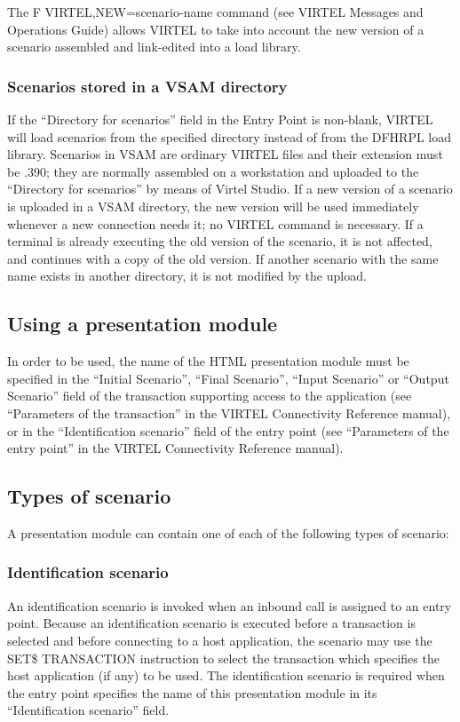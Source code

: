 \documentclass[letterpaper,10pt,english]{sphinxmanual}
\begin{document}
The F VIRTEL,NEW=scenario-name command (see VIRTEL Messages and Operations Guide) allows VIRTEL to take into
account the new version of a scenario assembled and link-edited into a load library.


\subsubsection{Scenarios stored in a VSAM directory}
\label{\detokenize{User_Guide:scenarios-stored-in-a-vsam-directory}}
If the “Directory for scenarios” field in the Entry Point is non-blank, VIRTEL will load scenarios from the specified
directory instead of from the DFHRPL load library.
Scenarios in VSAM are ordinary VIRTEL files and their extension must be .390; they are normally assembled on a
workstation and uploaded to the “Directory for scenarios” by means of Virtel Studio.
If a new version of a scenario is uploaded in a VSAM directory, the new version will be used immediately whenever a
new connection needs it; no VIRTEL command is necessary. If a terminal is already executing the old version of the
scenario, it is not affected, and continues with a copy of the old version. If another scenario with the same name exists
in another directory, it is not modified by the upload.


\subsection{Using a presentation module}
\label{\detokenize{User_Guide:using-a-presentation-module}}
In order to be used, the name of the HTML presentation module must be specified in the “Initial Scenario”, “Final
Scenario”, “Input Scenario” or “Output Scenario” field of the transaction supporting access to the application (see
“Parameters of the transaction” in the VIRTEL Connectivity Reference manual), or in the “Identification scenario” field
of the entry point (see “Parameters of the entry point” in the VIRTEL Connectivity Reference manual).


\subsection{Types of scenario}
\label{\detokenize{User_Guide:types-of-scenario}}
A presentation module can contain one of each of the following types of scenario:


\subsubsection{Identification scenario}
\label{\detokenize{User_Guide:identification-scenario}}
An identification scenario is invoked when an inbound call is assigned to an entry point. Because an identification
scenario is executed before a transaction is selected and before connecting to a host application, the scenario may use
the SET\$ TRANSACTION instruction to select the transaction which specifies the host application (if any) to be used.
The identification scenario is required when the entry point specifies the name of this presentation module in its
“Identification scenario” field.
\end{document}
